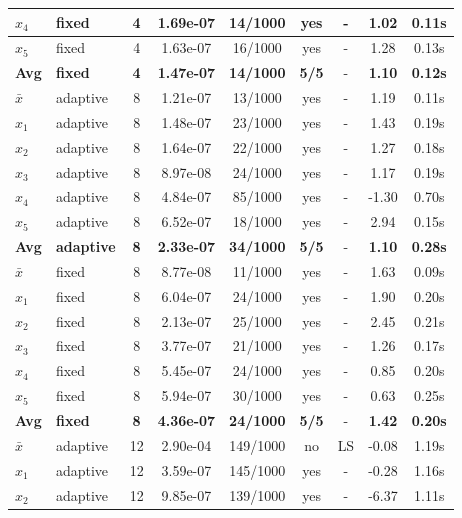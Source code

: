 \begin{longtable}{|l|l|c|c|c|c|c|c|c|}
\hline
$x_4$ & fixed & 4 & 1.69e-07 & 14/1000 & yes & - & 1.02 & 0.11s \\
\hline
$x_5$ & fixed & 4 & 1.63e-07 & 16/1000 & yes & - & 1.28 & 0.13s \\
\hline
\hline\hline
\textbf{Avg} & \textbf{fixed} & \textbf{4} & \textbf{1.47e-07} & \textbf{14/1000} & \textbf{5/5} & - & \textbf{1.10} & \textbf{0.12s} \\
\hline\hline
$\bar{x}$ & adaptive & 8 & 1.21e-07 & 13/1000 & yes & - & 1.19 & 0.11s \\
\hline
$x_1$ & adaptive & 8 & 1.48e-07 & 23/1000 & yes & - & 1.43 & 0.19s \\
\hline
$x_2$ & adaptive & 8 & 1.64e-07 & 22/1000 & yes & - & 1.27 & 0.18s \\
\hline
$x_3$ & adaptive & 8 & 8.97e-08 & 24/1000 & yes & - & 1.17 & 0.19s \\
\hline
$x_4$ & adaptive & 8 & 4.84e-07 & 85/1000 & yes & - & -1.30 & 0.70s \\
\hline
$x_5$ & adaptive & 8 & 6.52e-07 & 18/1000 & yes & - & 2.94 & 0.15s \\
\hline
\hline\hline
\textbf{Avg} & \textbf{adaptive} & \textbf{8} & \textbf{2.33e-07} & \textbf{34/1000} & \textbf{5/5} & - & \textbf{1.10} & \textbf{0.28s} \\
\hline\hline
\hline
$\bar{x}$ & fixed & 8 & 8.77e-08 & 11/1000 & yes & - & 1.63 & 0.09s \\
\hline
$x_1$ & fixed & 8 & 6.04e-07 & 24/1000 & yes & - & 1.90 & 0.20s \\
\hline
$x_2$ & fixed & 8 & 2.13e-07 & 25/1000 & yes & - & 2.45 & 0.21s \\
\hline
$x_3$ & fixed & 8 & 3.77e-07 & 21/1000 & yes & - & 1.26 & 0.17s \\
\hline
$x_4$ & fixed & 8 & 5.45e-07 & 24/1000 & yes & - & 0.85 & 0.20s \\
\hline
$x_5$ & fixed & 8 & 5.94e-07 & 30/1000 & yes & - & 0.63 & 0.25s \\
\hline
\hline\hline
\textbf{Avg} & \textbf{fixed} & \textbf{8} & \textbf{4.36e-07} & \textbf{24/1000} & \textbf{5/5} & - & \textbf{1.42} & \textbf{0.20s} \\
\hline\hline
$\bar{x}$ & adaptive & 12 & 2.90e-04 & 149/1000 & no & LS & -0.08 & 1.19s \\
\hline
$x_1$ & adaptive & 12 & 3.59e-07 & 145/1000 & yes & - & -0.28 & 1.16s \\
\hline
$x_2$ & adaptive & 12 & 9.85e-07 & 139/1000 & yes & - & -6.37 & 1.11s \\

\end{longtable}
